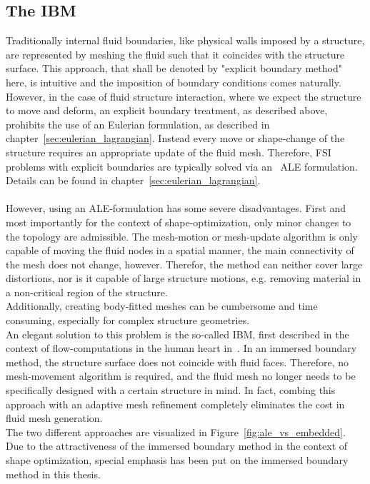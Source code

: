 \documentclass[../main.tex]{subfiles}
\begin{document}
\subsection{The \acf{IBM}}\label{sec:immersed_boundaries}
Traditionally internal fluid boundaries, like physical walls imposed by a structure, are represented by meshing the fluid such that it coincides with the structure surface. This approach, that shall be denoted by "explicit boundary method" here, is intuitive and the imposition of boundary conditions comes naturally.
However, in the case of fluid structure interaction, where we expect the structure to move and deform, an explicit boundary treatment, as described above, prohibits the use of an Eulerian formulation, as described in chapter~\ref{sec:eulerian_lagrangian}. Instead every move or shape-change of the structure requires an appropriate update of the fluid mesh. Therefore, \ac{FSI} problems with explicit boundaries are typically solved via an \
\ac{ALE} formulation. Details can be found in chapter~\ref{sec:eulerian_lagrangian}.\\
  \\
However, using an \ac{ALE}-formulation has some severe disadvantages. First and most importantly for the context of shape-optimization, only minor changes to the topology are admissible. The mesh-motion or mesh-update algorithm is only capable of moving the fluid nodes in a spatial manner, the main connectivity of the mesh does not change, however. Therefor, the method can neither cover large distortions, nor is it capable of large structure motions, e.g. removing material in a non-critical region of the structure.\\
Additionally, creating body-fitted meshes can be cumbersome and time consuming, especially for complex structure geometries.\\
An elegant solution to this problem is the so-called \acf{IBM}, first described in the context of flow-computations in the human heart in~\cite{Peskin1972}. In an immersed boundary method, the structure surface does not coincide with fluid faces. Therefore, no mesh-movement algorithm is required, and the fluid mesh no longer needs to be specifically designed with a certain structure in mind. In fact, combing this approach with an adaptive mesh refinement completely eliminates the cost in fluid mesh generation.\\
The two different approaches are visualized in Figure~\ref{fig:ale_vs_embedded}.
Due to the attractiveness of the immersed boundary method in the context of shape optimization, special emphasis has been put on the immersed boundary method in this thesis.
\end{document}
